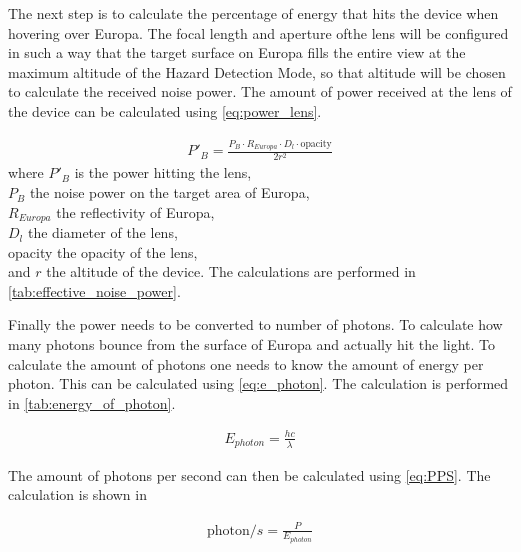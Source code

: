 

The next step is to calculate the percentage of energy that hits the device when hovering over Europa. The focal length and aperture ofthe lens will be configured in such a way that the target surface on Europa fills the entire view at the maximum altitude of the Hazard Detection Mode, so that altitude will be chosen to calculate the received noise power. The amount of power received at the lens of the device can be calculated using \cref{eq:power_lens}.

\begin{align}\label{eq:power_lens}
P'_B = \frac{P_B\cdot R_{Europa}\cdot D_l\cdot \text{opacity}}{2r^2}
\end{align}
where $P'_B$ is the power hitting the lens, \\
$P_B$ the noise power on the target area of Europa,\\
$R_{Europa}$ the reflectivity of Europa,\\
$D_l$ the diameter of the lens,\\
opacity the opacity of the lens,\\
and $r$ the altitude of the device. The calculations are performed in \cref{tab:effective_noise_power}.



Finally the power needs to be converted to number of photons. To calculate how many photons bounce from the surface of Europa and actually hit the light. To calculate the amount of photons one needs to know the amount of energy per photon. This can be calculated using \cref{eq:e_photon}. The calculation is performed in \cref{tab:energy_of_photon}.

\begin{align}\label{eq:e_photon}
E_{photon} = \frac{hc}{\lambda}
\end{align}

 

The amount of photons per second can then be calculated using \cref{eq:PPS}. The calculation is shown in

\begin{align}\label{eq:PPS}
\text{photon}/s = \frac{P}{E_{photon}}
\end{align}













